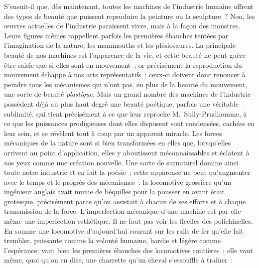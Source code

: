 \documentclass[french,twoside]{book} %
\begin{document}
S’ensuit-il que, dès maintenant, toutes les machines de l’industrie humaine offrent des types de beauté que puissent reproduire la peinture ou la sculpture ? Non, les œuvres actuelles de l’industrie paraissent vivre, mais à la façon des monstres. Leurs figures mêmes rappellent parfois les premières ébauches tentées par l’imagination de la nature, les mammouths et les plésiosaures. La principale  beauté de nos machines est l’apparence de la vie, et cette beauté ne peut guère être saisie que si elles sont en mouvement ; or précisément la reproduction du mouvement échappe à nos arts représentatifs : ceux-ci doivent donc renoncer à peindre tous les mécanismes qui n’ont pas, en plus de la beauté du mouvement, une sorte de beauté \emph{plastique}. Mais un grand nombre des machines de l’industrie possèdent déjà au plus haut degré une beauté poétique, parfois une véritable sublimité, qui tient précisément à ce que leur reproche M. Sully-Prudhomme, à ce que les puissances prodigieuses dont elles disposent sont condensées, cachées en leur sein, et se révèlent tout à coup par un apparent miracle. Les forces mécaniques de la nature sont si bien transformées en elles que, lorsqu’elles arrivent au point d’application, elles y aboutissent méconnaissables et éclatent à nos yeux comme une création nouvelle. Une sorte de surnaturel domine ainsi toute notre industrie et en fait la poésie ; cette apparence ne peut qu’augmenter avec le temps et le progrès des mécanismes : la locomotive grossière qu’un ingénieur anglais avait munie de béquilles pour la pousser en avant était grotesque, précisément parce qu’on assistait à chacun de ses efforts et à chaque transmission de la force. L’imperfection mécanique d’une machine est par elle-même une imperfection esthétique. Il ne faut pas voir les ficelles des polichinelles. En somme une locomotive d’aujourd’hui courant sur les rails de fer qu’elle fait trembler, puissante comme la volonté humaine, hardie et légère comme l’espérance, vaut bien les premières ébauches des locomotives routières ; elle vaut même,  quoi qu’on en dise, une charrette qu’un cheval s’essouffle à traîner :\par
\end{document}

